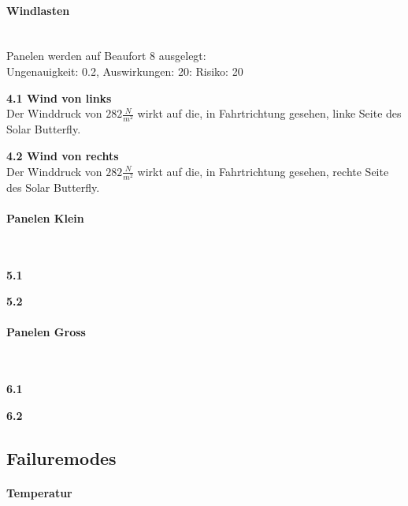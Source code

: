 \paragraph{Windlasten}\mbox{}\\
Panelen werden auf Beaufort 8 ausgelegt:\\
Ungenauigkeit: 0.2, Auswirkungen: 20: Risiko: 20
\begin{description}
  \item \textbf{4.1 Wind von links}\\ Der Winddruck von $282 \frac{N}{m^2}$ wirkt auf die, in Fahrtrichtung gesehen, linke Seite des Solar Butterfly.
  \item \textbf{4.2 Wind von rechts}\\ Der Winddruck von $282 \frac{N}{m^2}$ wirkt auf die, in Fahrtrichtung gesehen, rechte Seite des Solar Butterfly.
\end{description}


\paragraph{Panelen Klein}\mbox{}\\
\begin{description}
  \item \textbf{5.1 }\\
  \item \textbf{5.2 }\\
\end{description}

\paragraph{Panelen Gross}\mbox{}\\
\begin{description}
  \item \textbf{6.1 }\\
  \item \textbf{6.2 }\\
\end{description}


\subsection{Failuremodes}
\paragraph{Temperatur}\mbox{}\\
